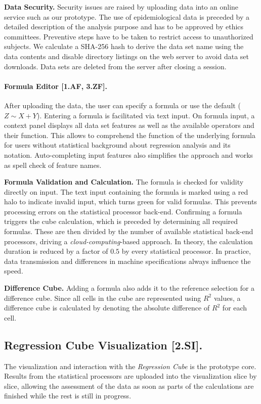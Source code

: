 \documentclass[journal]{style/vgtc} 			          %
\begin{document}
\textbf{Data Security.}
Security issues are raised by uploading data into an online service such as our prototype.
The use of epidemiological data is preceded by a detailed description of the analysis purpose and has to be approved by ethics committees.
Preventive steps have to be taken to restrict access to unauthorized subjects.
We calculate a SHA-256 hash to derive the data set name using the data contents and disable directory listings on the web server to avoid data set downloads.
Data sets are deleted from the server after closing a session.

\paragraph{Formula Editor [1.AF, 3.ZF].}
After uploading the data, the user can specify a formula or use the default ($Z \sim X + Y$).
Entering a formula is facilitated via text input.
On formula input, a context panel displays all data set features as well as the available operators and their function.
This allows to comprehend the function of the underlying formula for users without statistical background about regression analysis and its notation.
Auto-completing input features also simplifies the approach and works as spell check of feature names.

\textbf{Formula Validation and Calculation.} The formula is checked for validity directly on input.
The text input containing the formula is marked using a red halo to indicate invalid input, which turns green for valid formulas.
This prevents processing errors on the statistical processor back-end.
Confirming a formula triggers the cube calculation, which is preceded by determining all required formulas.
These are then divided by the number of available statistical back-end processors, driving a \emph{cloud-computing}-based approach.
In theory, the calculation duration is reduced by a factor of $0.5$ by every statistical processor.
In practice, data transmission and differences in machine specifications always influence the speed.

\textbf{Difference Cube.}
Adding a formula also adds it to the reference selection for a difference cube.
Since all cells in the cube are represented using $R^2$ values, a difference cube is calculated by denoting the absolute difference of $R^2$ for each cell.
\subsection{Regression Cube Visualization [2.SI].}
The visualization and interaction with the \emph{Regression Cube} is the prototype core.
Results from the statistical processors are uploaded into the visualization slice by slice, allowing the assessment of the data as soon as parts of the calculations are finished while the rest is still in progress.
\end{document}
